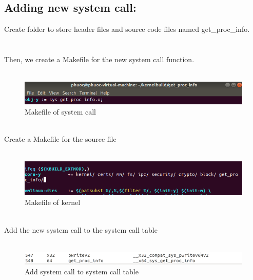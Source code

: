 \documentclass[a4paper]{article}
\begin{document}
\subsection{Adding new system call:}
Create folder to store header files and source code files named get\_proc\_info.\\
\noindent{}\\
\\
Then, we create a Makefile for the new system call function.\\
\noindent{}\\
\begin{figure}[h!]
\begin{center}
\includegraphics[width=14cm]{5.png}
\caption{Makefile of system call}
\end{center}
\end{figure}
\\
Create a Makefile for the source file\\
\noindent{}\\
\begin{figure}[h!]
\begin{center}
\includegraphics[width=14cm]{6.png}
\caption{Makefile of kernel}
\end{center}
\end{figure}
\\
Add the new system call to the system call table\\
\noindent{}\\
\begin{figure}[h!]
\begin{center}
\includegraphics[width=14cm]{7.png}
\caption{Add system call to system call table}
\end{center}
\end{figure}
\end{document}
